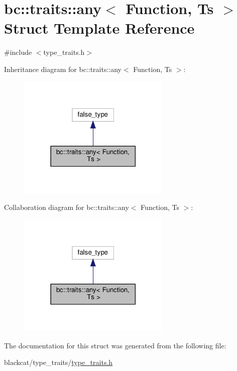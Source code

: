 \hypertarget{structbc_1_1traits_1_1any}{}\section{bc\+:\+:traits\+:\+:any$<$ Function, Ts $>$ Struct Template Reference}
\label{structbc_1_1traits_1_1any}


{\ttfamily \#include $<$type\+\_\+traits.\+h$>$}



Inheritance diagram for bc\+:\+:traits\+:\+:any$<$ Function, Ts $>$\+:\nopagebreak
\begin{figure}[H]
\begin{center}
\leavevmode
\includegraphics[width=206pt]{structbc_1_1traits_1_1any__inherit__graph}
\end{center}
\end{figure}


Collaboration diagram for bc\+:\+:traits\+:\+:any$<$ Function, Ts $>$\+:\nopagebreak
\begin{figure}[H]
\begin{center}
\leavevmode
\includegraphics[width=206pt]{structbc_1_1traits_1_1any__coll__graph}
\end{center}
\end{figure}


The documentation for this struct was generated from the following file\+:\begin{DoxyCompactItemize}
\item 
blackcat/type\+\_\+traits/\hyperlink{type__traits_2type__traits_8h}{type\+\_\+traits.\+h}\end{DoxyCompactItemize}

